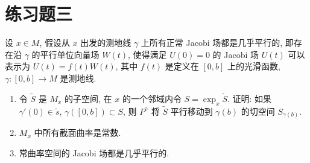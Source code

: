 \section{练习题三}



\begin{exercise}[2]
  设 $x\in M$, 假设从 $x$ 出发的测地线 $\gamma$ 上所有正常 Jacobi 场都是几乎平行的,
  即存在沿 $\gamma$ 的平行单位向量场 $W(t)$, 使得满足 $U(0)=0$ 的 Jacobi 场
  $U(t)$ 可以表示为 $U(t)=f(t)W(t)$,
  其中 $f(t)$ 是定义在 $[0,b]$ 上的光滑函数, $\gamma\colon [0,b]\to M$ 是测地线.
  \begin{enumerate}[(1)]
    \item 令 $\widetilde{S}$ 是 $M_x$ 的子空间, 在 $x$ 的一个邻域内令 $S=\exp_x\widetilde{S}$.
      证明: 如果 $\gamma'(0)\in\widetilde{s}$, $\gamma([0,b])\subset S$, 则
      $P^{\gamma}$ 将 $\widetilde{S}$ 平行移动到 $\gamma(b)$ 的切空间 $S_{\gamma(b)}$.
    \item $M_x$ 中所有截面曲率是常数.
    \item 常曲率空间的 Jacobi 场都是几乎平行的.
  \end{enumerate}
\end{exercise}

